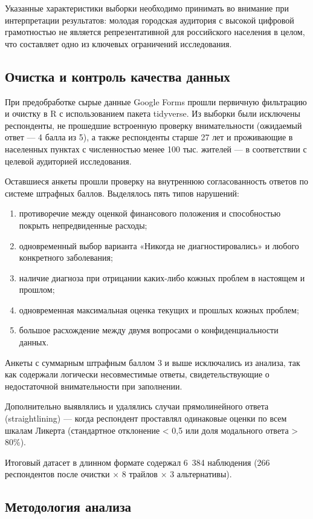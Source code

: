 \documentclass[12pt, a4paper]{article}
\begin{document}
Указанные характеристики выборки необходимо принимать во внимание при интерпретации результатов: молодая городская аудитория с высокой цифровой грамотностью не является репрезентативной для российского населения в целом, что составляет одно из ключевых ограничений исследования.

\subsection{Очистка и контроль качества данных}
При предобработке сырые данные Google Forms прошли первичную фильтрацию и очистку в R с использованием пакета tidyverse. Из выборки были исключены респонденты, не прошедшие встроенную проверку внимательности (ожидаемый ответ --- 4 балла из 5), а также респонденты старше 27 лет и проживающие в населенных пунктах с численностью менее 100 тыс. жителей --- в соответствии с целевой аудиторией исследования.

Оставшиеся анкеты прошли проверку на внутреннюю согласованность ответов по системе штрафных баллов. Выделялось пять типов нарушений:
\begin{enumerate}
    \item противоречие между оценкой финансового положения и способностью покрыть непредвиденные расходы;
    \item одновременный выбор варианта «Никогда не диагностировались» и любого конкретного заболевания;
    \item наличие диагноза при отрицании каких-либо кожных проблем в настоящем и прошлом;
    \item одновременная максимальная оценка текущих и прошлых кожных проблем;
    \item большое расхождение между двумя вопросами о конфиденциальности данных.
\end{enumerate}
Анкеты с суммарным штрафным баллом 3 и выше исключались из анализа, так как содержали логически несовместимые ответы, свидетельствующие о недостаточной внимательности при заполнении.

Дополнительно выявлялись и удалялись случаи прямолинейного ответа (straightlining) --- когда респондент проставлял одинаковые оценки по всем шкалам Ликерта (стандартное отклонение < 0,5 или доля модального ответа > 80\%).

Итоговый датасет в длинном формате содержал 6~384 наблюдения (266 респондентов после очистки × 8 трайлов × 3 альтернативы).

\subsection{Методология анализа}
\end{document}
